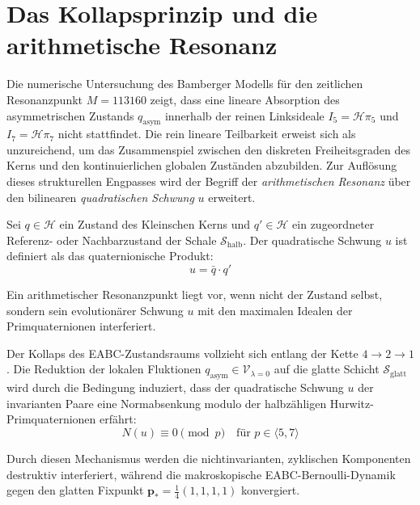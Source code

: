 \section{Das Kollapsprinzip und die arithmetische Resonanz}
\label{sec:kollapsprinzip}
Die numerische Untersuchung des Bamberger Modells für den zeitlichen Resonanzpunkt $M=113160$ zeigt, dass eine lineare Absorption des asymmetrischen Zustands $q_{\mathrm{asym}}$ innerhalb der reinen Linksideale $I_5 = \mathcal{H}\pi_5$ und $I_7 = \mathcal{H}\pi_7$ nicht stattfindet. Die rein lineare Teilbarkeit erweist sich als unzureichend, um das Zusammenspiel zwischen den diskreten Freiheitsgraden des Kerns und den kontinuierlichen globalen Zuständen abzubilden.
Zur Auflösung dieses strukturellen Engpasses wird der Begriff der \textit{arithmetischen Resonanz} über den bilinearen \textit{quadratischen Schwung} $u$ erweitert.
\begin{definition}
Sei $q \in \mathcal{H}$ ein Zustand des Kleinschen Kerns und $q' \in \mathcal{H}$ ein zugeordneter Referenz- oder Nachbarzustand der Schale $\mathcal{S}_{\mathrm{halb}}$. Der quadratische Schwung $u$ ist definiert als das quaternionische Produkt:
\begin{equation}
    u = \bar{q} \cdot q'
\end{equation}
\end{definition}
Ein arithmetischer Resonanzpunkt liegt vor, wenn nicht der Zustand selbst, sondern sein evolutionärer Schwung $u$ mit den maximalen Idealen der Primquaternionen interferiert. 
\begin{theorem}
\label{thm:kollaps-erweitert}
Der Kollaps des EABC-Zustandsraums vollzieht sich entlang der Kette $4 \rightarrow 2 \rightarrow 1$. Die Reduktion der lokalen Fluktionen $q_{\mathrm{asym}} \in \mathcal{V}_{\lambda=0}$ auf die glatte Schicht $\mathcal{S}_{\mathrm{glatt}}$ wird durch die Bedingung induziert, dass der quadratische Schwung $u$ der invarianten Paare eine Normabsenkung modulo der halbzähligen Hurwitz-Primquaternionen erfährt:
\begin{equation}
    N(u) \equiv 0 \pmod{p} \quad \text{für } p \in \langle 5, 7 \rangle
\end{equation}
\end{theorem}
Durch diesen Mechanismus werden die nichtinvarianten, zyklischen Komponenten destruktiv interferiert, während die makroskopische EABC-Bernoulli-Dynamik gegen den glatten Fixpunkt $\mathbf{p}_* = \frac{1}{4}(1,1,1,1)$ konvergiert.

